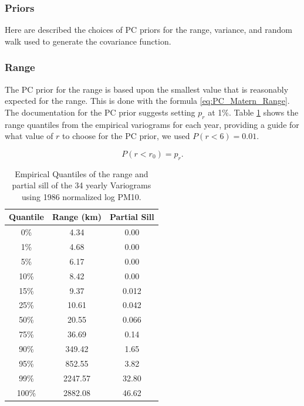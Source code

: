 \documentclass{article}
\begin{document}
\subsubsection*{Priors}
\label{subsubsec:priors}
Here are described the choices of \ac{PC} priors for the range, variance, and random walk used to generate the covariance function.

\subsubsection{Range}
\label{subsubsec:range}
The PC prior for the range is based upon the smallest value that is reasonably expected for the range.  This is done with the formula \ref{eq:PC_Matern_Range}.  The documentation for the PC prior suggests setting $p_r$ at 1\%. Table \ref{tab:Empirical_Range_Sill_Quantile} shows the range quantiles from the empirical variograms for each year, providing a guide for what value of $r$ to choose for the PC prior, we used $P(r < 6) = 0.01$.  

\begin{equation} \label{eq:PC_Matern_Range}
	P(r < r_0) = p_{r}.    
\end{equation} 

\begin{table}[ht]
	\centering
	\begin{tabular}{c||c|c}
		Quantile & Range (km) & Partial Sill \\
		\hline
		0\% & 4.34 & 0.00 \\
		1\% & 4.68 & 0.00 \\
		5\% & 6.17 & 0.00 \\
		10\% & 8.42 & 0.00 \\
		15\% & 9.37 & 0.012 \\
		25\% & 10.61 & 0.042 \\
		50\% & 20.55 & 0.066 \\
		75\% & 36.69 & 0.14 \\
		90\% & 349.42 & 1.65 \\
		95\% & 852.55 & 3.82 \\
		99\% & 2247.57 & 32.80 \\
		100\% & 2882.08 & 46.62 \\
		
	\end{tabular}
	\caption{Empirical Quantiles of the range and partial sill of the 34 yearly Variograms using 1986 normalized log PM10. }
	\label{tab:Empirical_Range_Sill_Quantile}
\end{table}
\end{document}
